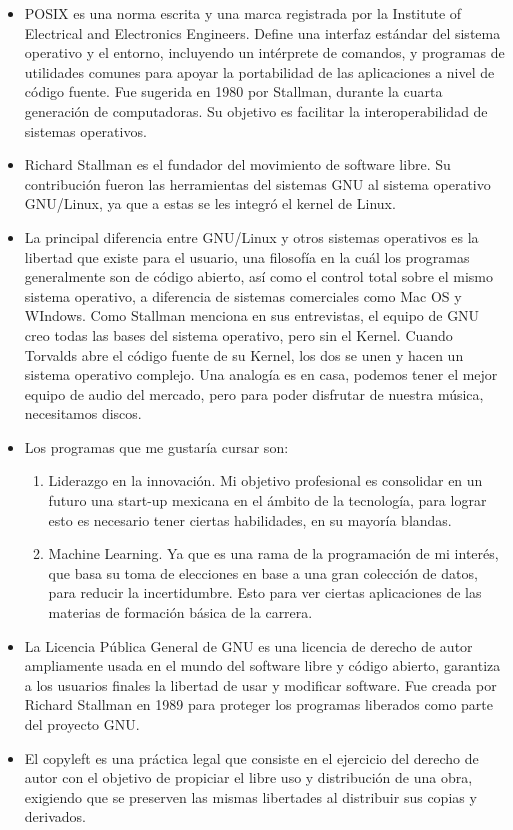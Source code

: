 \documentclass[a4paper,12pt]{article}
\begin{document}
\begin{itemize}
\item POSIX  es una norma escrita y una marca registrada por la Institute of Electrical and Electronics Engineers. Define una interfaz estándar del sistema operativo y el entorno, incluyendo un intérprete de comandos, y programas de utilidades comunes para apoyar la portabilidad de las aplicaciones a nivel de código fuente. Fue sugerida en 1980 por Stallman, durante la  cuarta generación de computadoras. Su objetivo es facilitar la interoperabilidad de sistemas operativos.
\item Richard Stallman es el fundador del movimiento de software libre. Su contribución fueron las herramientas del sistemas GNU al sistema operativo GNU/Linux, ya que a estas se les integró el kernel de Linux.
\item La principal diferencia entre GNU/Linux y otros sistemas operativos es la libertad que existe para el usuario, una filosofía en la cuál los programas generalmente son de código abierto, así como el control total sobre el mismo sistema operativo, a diferencia de sistemas comerciales como Mac OS y WIndows. Como Stallman menciona en sus entrevistas, el equipo de GNU creo todas las bases del sistema operativo, pero sin el Kernel. Cuando Torvalds abre el código fuente de su Kernel, los dos se unen y hacen un sistema operativo complejo. Una analogía es en casa, podemos tener el mejor equipo de audio del mercado, pero para poder disfrutar de nuestra música, necesitamos discos.
\item Los programas que me gustaría cursar son:
\begin{enumerate}
\item Liderazgo en la innovación. Mi objetivo profesional es consolidar en un futuro una start-up mexicana en el ámbito de la tecnología, para lograr esto es necesario tener ciertas habilidades, en su mayoría blandas.
\item Machine Learning. Ya que es una rama de la programación de mi interés, que basa su toma de elecciones en base a una gran colección de datos, para reducir la incertidumbre. Esto para ver ciertas aplicaciones de las materias de formación básica de la carrera. 
\end{enumerate}
\item La Licencia Pública General de GNU es una licencia de derecho de autor ampliamente usada en el mundo del software libre y código abierto, garantiza a los usuarios finales la libertad de usar y modificar software. Fue creada por Richard Stallman en 1989 para proteger los programas liberados como parte del proyecto GNU.

\item El copyleft es una práctica legal que consiste en el ejercicio del derecho de autor con el objetivo de propiciar el libre uso y distribución de una obra, exigiendo que se preserven las mismas libertades al distribuir sus copias y derivados. 
\end{itemize}
\end{document}
